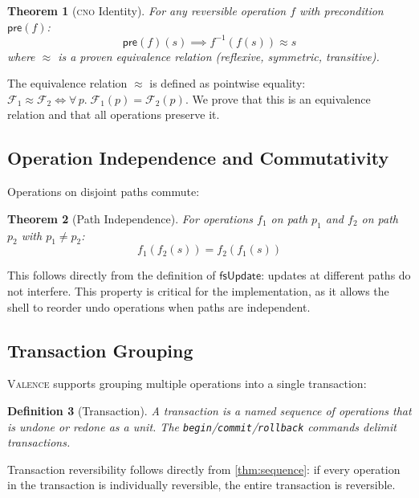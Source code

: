 \documentclass[11pt,a4paper]{article}
\newtheorem{theorem}{Theorem}[section]
\newtheorem{definition}[theorem]{Definition}
\newcommand{\FS}{\mathcal{F}}
\newcommand{\inv}[1]{#1^{-1}}
\newcommand{\pre}[1]{\mathsf{pre}(#1)}
\newcommand{\valence}{\textsc{Valence}}
\newcommand{\cno}{\textsc{cno}}
\begin{document}
\begin{theorem}[\cno{} Identity]
\label{thm:cno}
For any reversible operation $f$ with precondition $\pre{f}$:
\[
  \pre{f}(s) \implies \inv{f}(f(s)) \approx s
\]
where $\approx$ is a proven equivalence relation (reflexive, symmetric,
transitive).
\end{theorem}

The equivalence relation $\approx$ is defined as pointwise equality:
$\FS_1 \approx \FS_2 \iff \forall\, p.\; \FS_1(p) = \FS_2(p)$. We prove that
this is an equivalence relation and that all operations preserve it.

\subsection{Operation Independence and Commutativity}

Operations on disjoint paths commute:

\begin{theorem}[Path Independence]
\label{thm:independence}
For operations $f_1$ on path $p_1$ and $f_2$ on path $p_2$ with
$p_1 \neq p_2$:
\[
  f_1(f_2(s)) = f_2(f_1(s))
\]
\end{theorem}

This follows directly from the definition of $\mathsf{fsUpdate}$: updates at
different paths do not interfere. This property is critical for the
implementation, as it allows the shell to reorder undo operations when paths
are independent.

\subsection{Transaction Grouping}

\valence{} supports grouping multiple operations into a single transaction:

\begin{definition}[Transaction]
\label{def:transaction}
A \emph{transaction} is a named sequence of operations that is undone or
redone as a unit. The \texttt{begin}/\texttt{commit}/\texttt{rollback}
commands delimit transactions.
\end{definition}

Transaction reversibility follows directly from \cref{thm:sequence}: if every
operation in the transaction is individually reversible, the entire transaction
is reversible.

\end{document}
